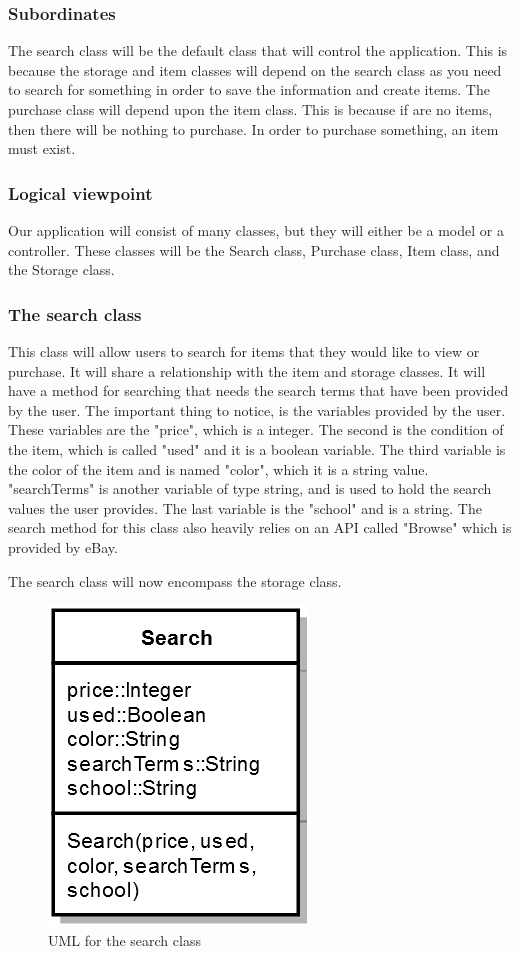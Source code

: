 \documentclass[journal,compsoc, 10pt, draftclsnofoot, onecolumn]{IEEEtran}
\begin{document}
\subsubsection*{Subordinates}
The search class will be the default class that will control the application. 
This is because the storage and item classes will depend on the search class 
as you need to search for something in order to save the information and create 
items. The purchase class will depend upon the item class. This is because if 
are no items, then there will be nothing to purchase. In order to purchase 
something, an item must exist. 

\subsubsection{Logical viewpoint}
Our application will consist of many classes, but they will either be a model or 
a controller. These classes will be the Search class, Purchase class, Item class, 
and the Storage class.

\subsubsection*{The search class}
This class will allow users to search for items that they would like to view or 
purchase. It will share a relationship with the item and storage classes. It 
will have a method for searching that needs the search terms that have been 
provided by the user. The important thing to notice, is the variables provided 
by the user. These variables are the "price", which is a integer. The second is 
the condition of the item, which is called "used" and it is a boolean variable. 
The third variable is the color of the item and is named "color", which it is a 
string value. "searchTerms" is another variable of type string, and is used to 
hold the search values the user provides. The last variable is the "school" and 
is a string. The search method for this class also heavily relies on an API 
called "Browse" which is provided by eBay. \newline

The search class will now encompass the storage class. 

\begin{figure}[h]
\centering
\caption{UML for the search class}
\includegraphics[scale=.9]{searchUML}
\end{figure}
\FloatBarrier
\end{document}
